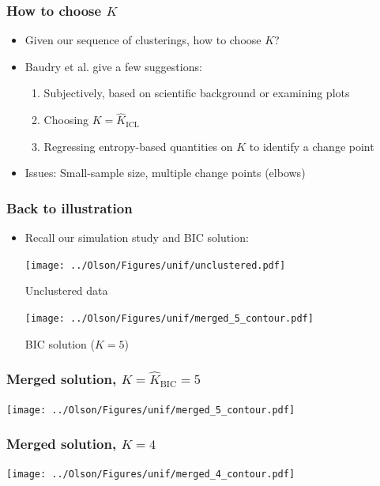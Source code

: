 \documentclass[mathserif,compress]{beamer}
\newcommand*\estim[1]{\widehat{#1}}
\renewcommand\;{\,}
\begin{document}
\begin{frame}\frametitle{How to choose $K$}
\begin{itemize}
\item[]
Given our sequence of clusterings, how to choose $K$?
\bigskip
\item[]
Baudry et al. give a few suggestions:
\begin{enumerate}
\bigskip
\item
Subjectively, based on scientific background or examining plots
\bigskip
\item
Choosing $K = \estim K_\text{ICL}$
\bigskip
\item
Regressing entropy-based quantities on $K$ to identify a change point
\end{enumerate}
\bigskip
\item[]
\alert{Issues:} Small-sample size, multiple change points (elbows)
\end{itemize}
\end{frame}

\begin{frame}\frametitle{Back to illustration}
\begin{itemize}
\item[]
Recall our simulation study and BIC solution:
\begin{minipage}{0.45\linewidth}
\texttt{[image: ../Olson/Figures/unif/unclustered.pdf]}
\begin{center}
Unclustered data
\end{center}
\end{minipage}
\hfill
\begin{minipage}{0.45\linewidth}
\texttt{[image: ../Olson/Figures/unif/merged\_5\_contour.pdf]}
\begin{center}
BIC solution ($K = 5$)
\end{center}
\end{minipage}
\end{itemize}
\end{frame}

\begin{frame}\frametitle{Merged solution, $K = \estim K_\text{BIC} = 5$}
\begin{center}
\texttt{[image: ../Olson/Figures/unif/merged\_5\_contour.pdf]}
\end{center}
\end{frame}

\begin{frame}\frametitle{Merged solution, $K = 4$}
\begin{center}
\texttt{[image: ../Olson/Figures/unif/merged\_4\_contour.pdf]}
\end{center}
\end{frame}
\end{document}
